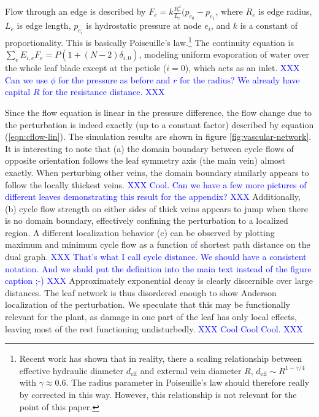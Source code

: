 \documentclass[10pt,aps,pra,twocolumn,superscriptaddress]{revtex4-1}
\newcommand{\dirk}[1]{\textcolor{blue}{#1}}
\begin{document}
Flow through an edge is described by $F_e = k\frac{R_e^4}{L_e} (p_{e_0}
-p_{e_1}$, where $R_e$ is edge radius, $L_e$ is edge length, $p_{e_i}$
is hydrostatic pressure at node $e_i$, and $k$ is a constant of 
proportionality. This is basically Poiseuille's law.\footnote{Recent
work has shown that in reality, there a scaling relationship between
effective hydraulic diameter $d_\mathrm{eff}$ and external vein diameter
$R$, $d_\mathrm{eff} \sim R^{1-\gamma/4}$ with $\gamma \approx 0.6$.
The radius parameter in Poiseuille's law should therefore really by
corrected in this way. However, this relationship is not relevant for
the point of this paper.}
The continuity equation is $\sum_e E_{i,e} F_e = P(1 + (N-2)\delta_{i,0})$,
modeling uniform evaporation of water over the whole leaf blade 
except at the petiole ($i=0$), which acts as an inlet.
\dirk{XXX Can we use $\phi$ for the pressure as before and $r$ for
the radius? We already have capital $R$ for the resistance distance. XXX} 

Since the flow equation is linear in the pressure difference, the
flow change due to the perturbation is indeed exactly 
(up to a constant factor) described by equation (\ref{eqn:cflow-lin}).
The simulation results are shown in figure \ref{fig:vascular-network}.
It is interesting to note that (a) the domain boundary between cycle
flows of opposite orientation follows the leaf symmetry axis (the main
vein) almost exactly. When perturbing other veins, the domain boundary
similarly appears to follow the locally thickest veins.
\dirk{XXX Cool. Can we have a few more pictures of different leaves 
demonstrating this result for the appendix? XXX}
Additionally, (b) cycle flow strength on either sides of thick veins
appears to jump when there is no domain boundary, effectively confining
the perturbation to a localized region.
A different localization behavior (c) can be observed by plotting
maximum and minimum cycle flow as a function of shortest path distance
on the dual graph. 
\dirk{XXX That's what I call cycle distance. We should have a consistent
notation. And we shuld put the definition into the main text instead 
of the figure caption ;-) XXX}
Approximately exponential decay is clearly discernible
over large distances. The leaf network is thus disordered enough
to show Anderson localization of the perturbation.
We speculate that this may be functionally relevant for the plant,
as damage in one part of the leaf has only local effects, leaving
most of the rest functioning undisturbedly.
\dirk{XXX Cool Cool Cool. XXX}
\end{document}

